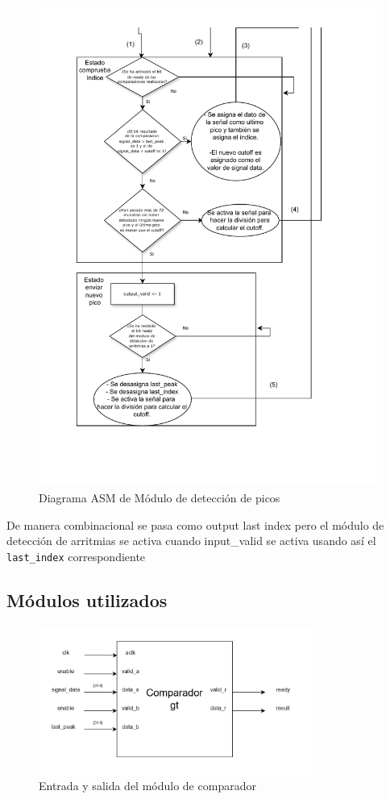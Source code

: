 \begin{figure}[h!]
    \centering
    \includegraphics[width=0.99\textwidth]{./Images/img_implementacion_hw/Diagramaasmpicos2.pdf}
    \caption{Diagrama ASM de Módulo de detección de picos}
    \label{fig:Diagramaasmpicos2}
\end{figure} 
\FloatBarrier
De manera combinacional se pasa como output last index pero el módulo de detección de arritmias se activa cuando input\_valid
se activa usando así el \texttt{last\_index} correspondiente 

\subsection{Módulos utilizados}

\begin{figure}[h!]
    \centering
    \includegraphics[width=0.8\textwidth]{./Images/img_implementacion_hw/comparadorgt.png}
    \caption{Entrada y salida del módulo de comparador}
    \label{fig:comparadorgt}
\end{figure}

